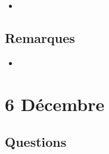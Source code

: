 \documentclass[a4paper, 11pt, hidelinks]{article}
\begin{document}
\begin{itemize}
    \item 
\end{itemize}


\subsection{Remarques}


\begin{itemize}
    \item 
\end{itemize}


\section{6 Décembre}



\subsection{Questions}
\end{document}
